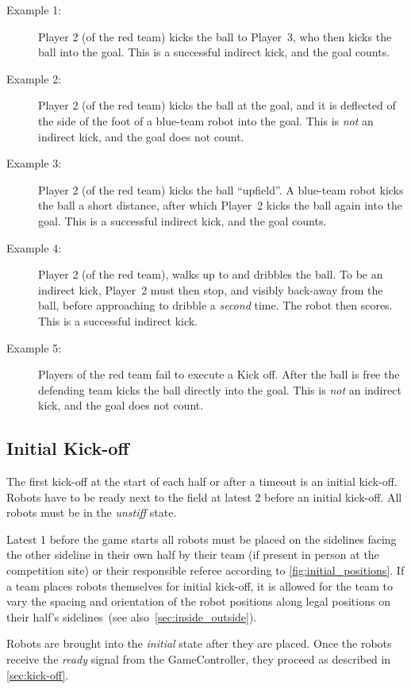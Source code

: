 \begin{description}
  \item[Example 1:] Player 2 (of the red team) kicks the ball to Player~3, who then kicks the ball into the goal. This is a successful indirect kick, and the goal counts.
  \item[Example 2:] Player 2 (of the red team) kicks the ball at the goal, and it is deflected of the side of the foot of a blue-team robot into the goal. This is \textit{not} an indirect kick, and the goal does not count.
  \item[Example 3:] Player 2 (of the red team) kicks the ball ``upfield''. A blue-team robot kicks the ball a short distance, after which Player~2 kicks the ball again into the goal. This is a successful indirect kick, and the goal counts.
  \item[Example 4:] Player 2 (of the red team), walks up to and dribbles the ball. To be an indirect kick, Player~2 must then stop, and visibly back-away from the ball, before approaching to dribble a \textit{second} time. The robot then scores. This is a successful indirect kick.
  \item[Example 5:] Players of the red team fail to execute a Kick off. After the ball is free the defending team kicks the ball directly into the goal. This is \textit{not} an indirect kick, and the goal does not count.
\end{description}

\subsection{Initial Kick-off}
\label{sec:initial-kick-off}

The first kick-off at the start of each half or after a timeout is an initial kick-off. Robots have to be ready next to the field at latest \qty{2}{\min} before an initial kick-off. All robots must be in the \textit{unstiff} state.

Latest \qty{1}{\min} before the game starts all robots must be placed on the sidelines facing the other sideline in their own half by their team (if present in person at the competition site) or their responsible referee according to \cref{fig:initial_positions}. If a team places robots themselves for initial kick-off, it is allowed for the team to vary the spacing and orientation of the robot positions along legal positions on their half's sidelines~(see also~\cref{sec:inside_outside}).

Robots are brought into the \textit{initial} state after they are placed. Once the robots receive the \emph{ready} signal from the GameController, they proceed as described in \cref{sec:kick-off}.

